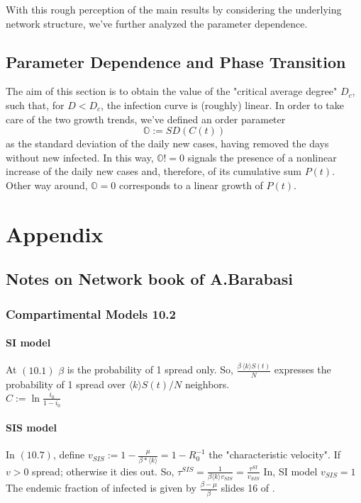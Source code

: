 \documentclass[a4paper,11pt,twoside]{report} %
\begin{document}
With this rough perception of the main results by considering the underlying network structure, we've further analyzed the parameter dependence.

\section{Parameter Dependence and Phase Transition}
The aim of this section is to obtain the value of the "critical average degree" $D_c$, such that, for $D<D_c$, the infection curve is (roughly) linear. In order to take care of the two growth trends, we've defined an order parameter 
\begin{equation}
    \label{def::sdc}
    \mathbb{O}:=SD(C(t))
\end{equation}{}
as the standard deviation of the daily new cases, having removed the days without new infected. In this way,     $\mathbb{O}!=0$ signals the presence of a nonlinear increase of the daily new cases and, therefore, of its cumulative sum $P(t)$. Other way around, $\mathbb{O}=0$ corresponds to a linear growth of $P(t)$.




\chapter{Appendix}

\section{Notes on Network book of A.Barabasi}

\subsection{Compartimental Models 10.2}
\subsubsection{SI model}
At $(10.1)$ $\beta$ is the probability of 1 spread only. So, $\frac{\beta \, \langle k \rangle S(t)}{N}$ expresses the probability of 1 spread over $\langle k\rangle S(t)/N$ neighbors. \\
$C:=\ln{\frac{i_0}{1-i_0}}$

\subsubsection{SIS model}

In $(10.7)$, define $v_{SIS}:=1-\frac{\mu}{\beta*\langle k\rangle }=1-R_0^{-1}$ the "characteristic velocity". If $v>0$ spread; otherwise it dies out. So, $\tau^{SIS}=\frac{1}{\beta\langle k\rangle v_{SIS}}=\frac{\tau^{SI}}{v_{SIS}}$ In, SI model $v_{SIS}=1$ \cite{barabasi2016network}
\newline
The endemic fraction of infected is given by $\frac{\beta-\mu}{\beta}$ slides 16 of \cite{lde_slides}.
\end{document}
